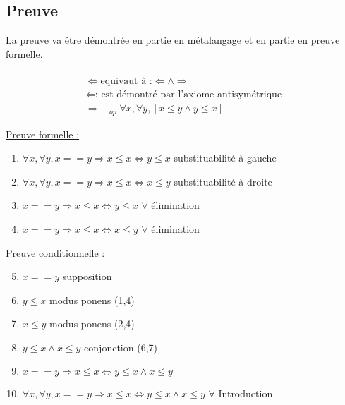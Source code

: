 \subsection{Preuve}
La preuve va être démontrée en partie en métalangage et en partie en preuve formelle.\\ \\
\begin{align*}
\Leftrightarrow \text{equivaut à :} \Leftarrow \land \Rightarrow \\
\Leftarrow \text{: est démontré par l'axiome antisymétrique} \\	
\Rightarrow \models_{op} \forall x, \forall y, [x\leq y \land y \leq x] 
\end{align*}

\underline{Preuve formelle :}
\begin{enumerate}
\item $ \forall x, \forall y, x==y \Rightarrow x \leq x \Leftrightarrow y \leq x$ \hfill substituabilité à gauche
\item $ \forall x, \forall y, x==y \Rightarrow x \leq x \Leftrightarrow x \leq y$ \hfill substituabilité à droite
\item $ x==y \Rightarrow x \leq x \Leftrightarrow y \leq x $ \hfill $\forall$ élimination
\item $ x==y \Rightarrow x \leq x \Leftrightarrow x \leq y $ \hfill $\forall$ élimination
\end{enumerate}

\underline{Preuve conditionnelle :}
\begin{enumerate}
\setcounter{enumi}{4}
\item $ x==y$ \hfill supposition
\item $ y\leq x$ \hfill modus ponens (1,4)
\item $ x\leq y$ \hfill modus ponens (2,4)
\item $ y\leq x \land  x\leq y$ \hfill conjonction (6,7)
\item $ x==y \Rightarrow x \leq x \Leftrightarrow y\leq x \land  x\leq y$
\item $ \forall x, \forall y, x==y \Rightarrow x \leq x \Leftrightarrow y\leq x \land  x\leq y$ \hfill $\forall$ Introduction
\end{enumerate}
